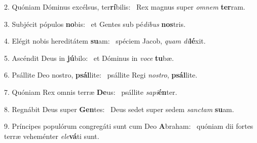 2. Quóniam Dóminus excélsus, ter\textbf{rí}bilis: \ast\  Rex magnus super \textit{om}\textit{nem} \textbf{ter}ram.\

3. Subjécit pópulos \textbf{no}bis: \ast\  et Gentes sub pé\textit{di}\textit{bus} \textbf{nos}tris.\

4. Elégit nobis hereditátem \textbf{su}am: \ast\  spéciem Jacob, \textit{quam} \textit{di}\textbf{lé}xit.\

5. Ascéndit Deus in \textbf{jú}bilo: \ast\  et Dóminus in \textit{vo}\textit{ce} \textbf{tu}bæ.\

6. Psállite Deo nostro, \textbf{psál}lite: \ast\  psállite Regi \textit{nos}\textit{tro}, \textbf{psál}lite.\

7. Quóniam Rex omnis terræ \textbf{De}us: \ast\  psállite \textit{sa}\textit{pi}\textbf{én}ter.\

8. Regnábit Deus super \textbf{Gen}tes: \ast\  Deus sedet super sedem \textit{sanc}\textit{tam} \textbf{su}am.\

9. Príncipes populórum congregáti sunt cum Deo \textbf{A}braham: \ast\  quóniam dii fortes terræ veheménter \textit{e}\textit{le}\textbf{vá}ti sunt.\

